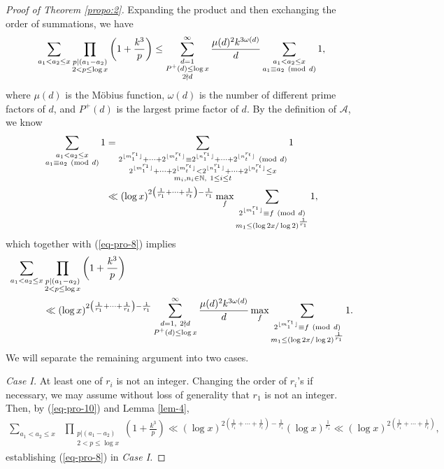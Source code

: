 \documentclass[12pt,a4paper,reqno]{amsart}
\numberwithin{equation}{section}
\def\pmod #1{\ ({\rm{mod}}\ #1)}
\theoremstyle{plain}
\theoremstyle{definition}
\begin{document}
\begin{proof}[Proof of Theorem \ref{propo:2}]
Expanding the product and then exchanging the order of summations, we have
\begin{align}\label{eq-pro-9}
\sum_{a_1<a_2\le x}\prod_{\substack{p|(a_1-a_2)\\2<p\le \log x}}\left(1+\frac{k^3}{p}\right)\le 
\sum_{\substack{d=1 \\P^+(d)\le \log x\\ 2\nmid d}}^{\infty}\frac{\mu(d)^2 k^{3\omega(d)}}{d}\sum_{\substack{a_1<a_2\le x\\ a_1\equiv a_2\pmod{d}}}1,
\end{align}
where $\mu(d)$ is the M\"obius function, $\omega(d)$ is the number of different prime factors of $d$, and $P^+(d)$ is the largest prime factor of $d$. By the definition of $\mathcal{A}$, we know
\begin{align*}
\sum_{\substack{a_1<a_2\le x\\ a_1\equiv a_2\pmod{d}}}1&=\sum_{\substack{2^{ \lfloor m_1^{r_1}\rfloor}+\cdots+2^{\lfloor m_t^{r_t}\rfloor}\equiv 2^{ \lfloor n_1^{r_1}\rfloor}+\cdots+2^{\lfloor n_t^{r_t}\rfloor}\pmod{d}\\2^{ \lfloor m_1^{r_1}\rfloor}+\cdots+2^{\lfloor m_t^{r_t}\rfloor}<2^{ \lfloor n_1^{r_1}\rfloor}+\cdots+2^{\lfloor n_t^{r_t}\rfloor}\le x\\m_i, n_i\in \mathbb{N},\ 1\le i\le t}}1\nonumber\\
&\ll (\log x)^{2\left(\frac{1}{r_1}+\cdots+\frac{1}{r_t}\right)-\frac{1}{r_1}}\max_{f}\sum_{\substack{2^{ \lfloor m_1^{r_1}\rfloor}\equiv f\pmod{d}\\ m_1\le (\log 2x/\log 2)^{\frac{1}{r_1}}}}1,
\end{align*}
which together with (\ref{eq-pro-8}) implies 
\begin{align}\label{eq-pro-10}
\sum_{a_1<a_2\le x}&\prod_{\substack{p|(a_1-a_2)\\2<p\le \log x}}\left(1+\frac{k^3}{p}\right)\nonumber\\
&\ll (\log x)^{2\left(\frac{1}{r_1}+\cdots+\frac{1}{r_t}\right)-\frac{1}{r_1}}\sum_{\substack{d=1,\ 2\nmid d \\P^+(d)\le \log x}}^{\infty}\frac{\mu(d)^2 k^{3\omega(d)}}{d}\max_{f}\sum_{\substack{2^{ \lfloor m_1^{r_1}\rfloor}\equiv f\pmod{d}\\ m_1\le (\log 2x/\log 2)^{\frac{1}{r_1}}}}1.
\end{align}
We will separate the remaining argument into two cases.

{\it Case I.} At least one of $r_i$ is not an integer. Changing the order of $r_i$'s if necessary, we may assume without loss of generality that $r_1$ is not an integer. Then, by (\ref{eq-pro-10}) and Lemma \ref{lem-4},
\begin{align*}
\sum_{a_1<a_2\le x}&\prod_{\substack{p|(a_1-a_2)\\2<p\le \log x}}\left(1+\frac{k^3}{p}\right)\ll (\log x)^{2\left(\frac{1}{r_1}+\cdots+\frac{1}{r_t}\right)-\frac{1}{r_1}}(\log x)^{\frac{1}{r_1}}\ll (\log x)^{2\left(\frac{1}{r_1}+\cdots+\frac{1}{r_t}\right)},
\end{align*}
establishing (\ref{eq-pro-8}) in {\it Case I.}


\end{proof}
\end{document}
